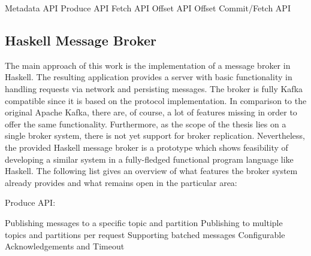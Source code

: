 \begin{itemize}
    \tick Metadata API
    \tick Produce API
    \tick Fetch API
    \fail Offset API
    \fail Offset Commit/Fetch API
\end{itemize}
\newpage
\subsection{Haskell Message Broker}

The main approach of this work is the implementation of a message broker in
Haskell. The resulting application provides a server with basic functionality in
handling requests via network and persisting messages. The broker is fully Kafka
compatible since it is based on the protocol implementation.  In comparison to the
original Apache Kafka, there are, of course, a lot of features missing in order to offer the
same functionality. Furthermore, as the scope of the thesis lies on a single
broker system, there is not yet support for broker replication. Nevertheless, the
provided Haskell message broker is a prototype which shows feasibility of
developing a similar system in a fully-fledged functional program language like
Haskell. The following list gives an overview of what features the broker system
already provides and what remains open in the particular area:

Produce API:
\begin{itemize}
        \tick Publishing messages to a specific topic and partition
        \tick Publishing to multiple topics and partitions per request
        \tick Supporting batched messages
        \fail Configurable Acknowledgements and Timeout
\end{itemize}

